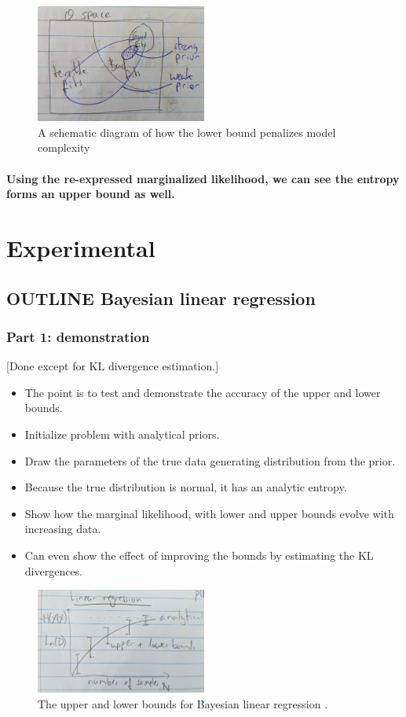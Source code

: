 \documentclass[10pt,a4paper]{article}
\begin{document}
\begin{figure}
\centering
\includegraphics[width=0.5\textwidth]{lower-bound_occams-razor}
\caption{A schematic diagram of how the lower bound penalizes model complexity}
\label{fig:lb_complexity}
\end{figure}


\paragraph{Using the re-expressed marginalized likelihood, we can see the entropy forms an upper bound as well.}


\section{Experimental}
\subsection{OUTLINE Bayesian linear regression}
\subsubsection{Part 1: demonstration}
[Done except for KL divergence estimation.]
\begin{itemize}
\item The point is to test and demonstrate the accuracy of the upper and lower bounds.
\item Initialize problem with analytical priors.
\item Draw the parameters of the true data generating distribution from the prior.
\item Because the true distribution is normal, it has an analytic entropy. 
\item Show how the marginal likelihood, with lower and upper bounds evolve with increasing data.
\item Can even show the effect of improving the bounds by estimating the KL divergences.
\end{itemize}
\begin{figure}[h]
\centering
\includegraphics[width=0.5\textwidth]{expected_linregress_result}
\caption{The upper and lower bounds for Bayesian linear regression .}
\label{fig:bayes_linregress}
\end{figure}
\end{document}
